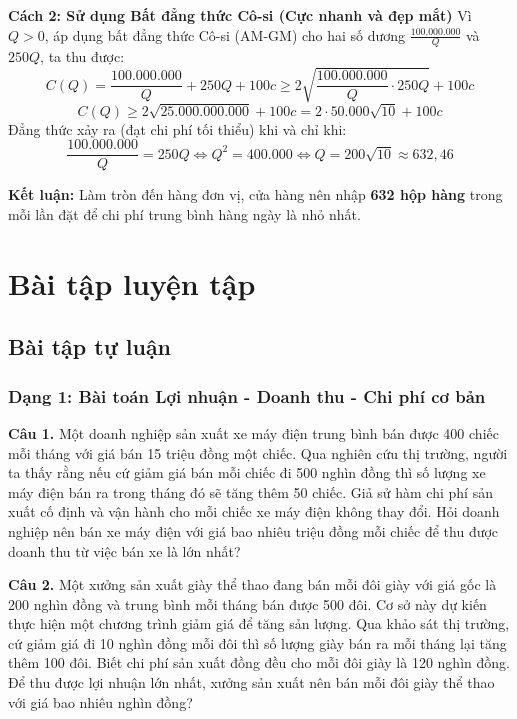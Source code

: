 \documentclass[12pt]{article}
\begin{document}
\begin{loigiai}
		\vspace{2mm}
		\textbf{Cách 2: Sử dụng Bất đẳng thức Cô-si (Cực nhanh và đẹp mắt)}
		Vì $Q > 0$, áp dụng bất đẳng thức Cô-si (AM-GM) cho hai số dương $\frac{100.000.000}{Q}$ và $250Q$, ta thu được:
		\[ C(Q) = \frac{100.000.000}{Q} + 250Q + 100c \ge 2\sqrt{\frac{100.000.000}{Q} \cdot 250Q} + 100c \]
		\[ C(Q) \ge 2\sqrt{25.000.000.000} + 100c = 2 \cdot 50.000\sqrt{10} + 100c \]
		Đẳng thức xảy ra (đạt chi phí tối thiểu) khi và chỉ khi:
		\[ \frac{100.000.000}{Q} = 250Q \Leftrightarrow Q^2 = 400.000 \Leftrightarrow Q = 200\sqrt{10} \approx 632,46 \]
		
		\vspace{2mm}
		\textbf{Kết luận:} Làm tròn đến hàng đơn vị, cửa hàng nên nhập \textbf{632 hộp hàng} trong mỗi lần đặt để chi phí trung bình hàng ngày là nhỏ nhất.
	\end{loigiai}
	
	\newpage
	
	\section{Bài tập luyện tập}
	\subsection{Bài tập tự luận}
	\subsubsection{Dạng 1: Bài toán Lợi nhuận - Doanh thu - Chi phí cơ bản}
	
	\noindent \textbf{Câu 1.} Một doanh nghiệp sản xuất xe máy điện trung bình bán được 400 chiếc mỗi tháng với giá bán 15 triệu đồng một chiếc. Qua nghiên cứu thị trường, người ta thấy rằng nếu cứ giảm giá bán mỗi chiếc đi 500 nghìn đồng thì số lượng xe máy điện bán ra trong tháng đó sẽ tăng thêm 50 chiếc. Giả sử hàm chi phí sản xuất cố định và vận hành cho mỗi chiếc xe máy điện không thay đổi. Hỏi doanh nghiệp nên bán xe máy điện với giá bao nhiêu triệu đồng mỗi chiếc để thu được doanh thu từ việc bán xe là lớn nhất?
	
	\vspace{0.6cm}
	\noindent \textbf{Câu 2.} Một xưởng sản xuất giày thể thao đang bán mỗi đôi giày với giá gốc là 200 nghìn đồng và trung bình mỗi tháng bán được 500 đôi. Cơ sở này dự kiến thực hiện một chương trình giảm giá để tăng sản lượng. Qua khảo sát thị trường, cứ giảm giá đi 10 nghìn đồng mỗi đôi thì số lượng giày bán ra mỗi tháng lại tăng thêm 100 đôi. Biết chi phí sản xuất đồng đều cho mỗi đôi giày là 120 nghìn đồng. Để thu được lợi nhuận lớn nhất, xưởng sản xuất nên bán mỗi đôi giày thể thao với giá bao nhiêu nghìn đồng?
	
\end{document}
